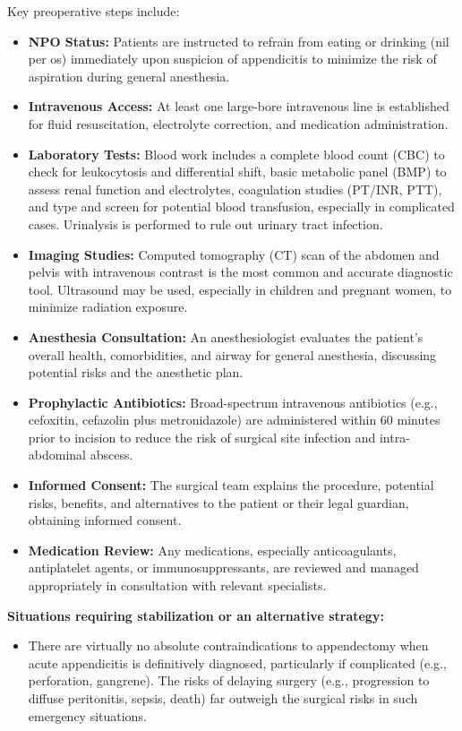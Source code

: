 Key preoperative steps include:
\begin{itemize}
  \item \textbf{NPO Status:} Patients are instructed to refrain from eating or drinking (nil per os) immediately upon suspicion of appendicitis to minimize the risk of aspiration during general anesthesia.
  \item \textbf{Intravenous Access:} At least one large-bore intravenous line is established for fluid resuscitation, electrolyte correction, and medication administration.
  \item \textbf{Laboratory Tests:} Blood work includes a complete blood count (CBC) to check for leukocytosis and differential shift, basic metabolic panel (BMP) to assess renal function and electrolytes, coagulation studies (PT/INR, PTT), and type and screen for potential blood transfusion, especially in complicated cases. Urinalysis is performed to rule out urinary tract infection.
  \item \textbf{Imaging Studies:} Computed tomography (CT) scan of the abdomen and pelvis with intravenous contrast is the most common and accurate diagnostic tool. Ultrasound may be used, especially in children and pregnant women, to minimize radiation exposure.
  \item \textbf{Anesthesia Consultation:} An anesthesiologist evaluates the patient's overall health, comorbidities, and airway for general anesthesia, discussing potential risks and the anesthetic plan.
  \item \textbf{Prophylactic Antibiotics:} Broad-spectrum intravenous antibiotics (e.g., cefoxitin, cefazolin plus metronidazole) are administered within 60 minutes prior to incision to reduce the risk of surgical site infection and intra-abdominal abscess.
  \item \textbf{Informed Consent:} The surgical team explains the procedure, potential risks, benefits, and alternatives to the patient or their legal guardian, obtaining informed consent.
  \item \textbf{Medication Review:} Any medications, especially anticoagulants, antiplatelet agents, or immunosuppressants, are reviewed and managed appropriately in consultation with relevant specialists.
\end{itemize}

\textbf{Situations requiring stabilization or an alternative strategy:}
\begin{itemize}
  \item There are virtually no absolute contraindications to appendectomy when acute appendicitis is definitively diagnosed, particularly if complicated (e.g., perforation, gangrene). The risks of delaying surgery (e.g., progression to diffuse peritonitis, sepsis, death) far outweigh the surgical risks in such emergency situations.
\end{itemize}

